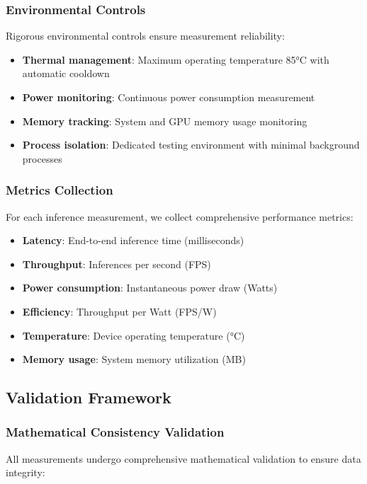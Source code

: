 \documentclass[manuscript]{acmart}
\begin{document}
\subsubsection{Environmental Controls}
Rigorous environmental controls ensure measurement reliability:

\begin{itemize}
    \item \textbf{Thermal management}: Maximum operating temperature 85°C with automatic cooldown
    \item \textbf{Power monitoring}: Continuous power consumption measurement
    \item \textbf{Memory tracking}: System and GPU memory usage monitoring
    \item \textbf{Process isolation}: Dedicated testing environment with minimal background processes
\end{itemize}

\subsubsection{Metrics Collection}
For each inference measurement, we collect comprehensive performance metrics:

\begin{itemize}
    \item \textbf{Latency}: End-to-end inference time (milliseconds)
    \item \textbf{Throughput}: Inferences per second (FPS)
    \item \textbf{Power consumption}: Instantaneous power draw (Watts)
    \item \textbf{Efficiency}: Throughput per Watt (FPS/W)
    \item \textbf{Temperature}: Device operating temperature (°C)
    \item \textbf{Memory usage}: System memory utilization (MB)
\end{itemize}

\subsection{Validation Framework}

\subsubsection{Mathematical Consistency Validation}
All measurements undergo comprehensive mathematical validation to ensure data integrity:
\end{document}
